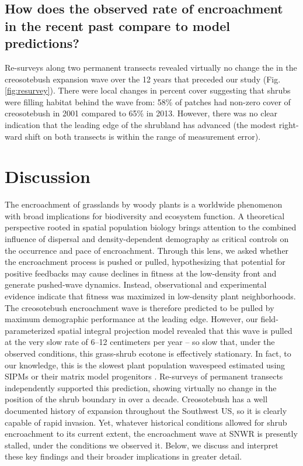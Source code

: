 \documentclass[11pt]{article}\usepackage[]{graphicx}\usepackage[usenames,dvipsnames]{xcolor}
\begin{document}
\subsection*{How does the observed rate of encroachment in the recent past compare to model predictions?}
Re-surveys along two permanent transects revealed virtually no change the in the creosotebush expansion wave over the 12 years that preceded our study (Fig. \ref{fig:resurvey}).
There were local changes in percent cover suggesting that shrubs were filling habitat behind the wave from: 58\% of patches had non-zero cover of creosotebush in 2001 compared to 65\% in 2013.
However, there was no clear indication that the leading edge of the shrubland has advanced (the modest right-ward shift on both transects is within the range of measurement error). 

\section*{Discussion}

The encroachment of grasslands by woody plants is a worldwide phenomenon with broad implications for biodiversity and ecosystem function. 
A theoretical perspective rooted in spatial population biology brings attention to the combined influence of dispersal and density-dependent demography as critical controls on the occurrence and pace of encroachment. 
Through this lens, we asked whether the encroachment process is pushed or pulled, hypothesizing that potential for positive feedbacks may cause declines in fitness at the low-density front and generate pushed-wave dynamics. 
Instead, observational and experimental evidence indicate that fitness was maximized in low-density plant neighborhoods.
The creosotebush encroachment wave is therefore predicted to be pulled by maximum demographic performance at the leading edge.
However, our field-parameterized spatial integral projection model revealed that this wave is pulled at the very slow rate of 6--12 centimeters per year -- so slow that, under the observed conditions, this grass-shrub ecotone is effectively stationary. 
In fact, to our knowledge, this is the slowest plant population wavespeed estimated using SIPMs or their matrix model progenitors \citep{neubert2000demography}. 
Re-surveys of permanent transects independently supported this prediction, showing virtually no change in the position of the shrub boundary in over a decade. 
Creosotebush has a well documented history of expansion throughout the Southwest US, so it is clearly capable of rapid invasion.
Yet, whatever historical conditions allowed for shrub encroachment to its current extent, the encroachment wave at SNWR is presently stalled, under the conditions we observed it.
Below, we discuss and interpret these key findings and their broader implications in greater detail. 
\end{document}
